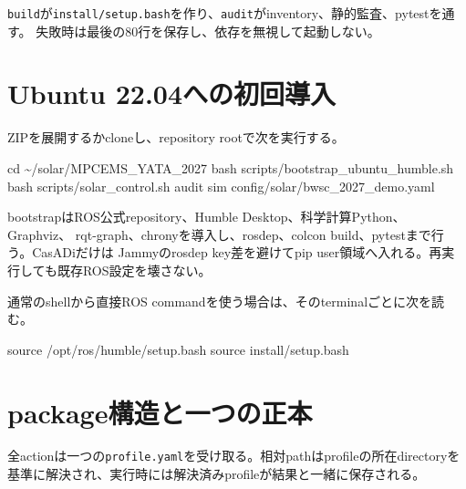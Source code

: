 \documentclass[
  japanese,
  a4paper,
]{article}
\newenvironment{Shaded}{}{}
\newcommand{\BuiltInTok}[1]{\textcolor[rgb]{0.00,0.50,0.00}{#1}}
\newcommand{\FunctionTok}[1]{\textcolor[rgb]{0.02,0.16,0.49}{#1}}
\newcommand{\NormalTok}[1]{#1}
\begin{document}
\texttt{build}が\texttt{install/setup.bash}を作り、\texttt{audit}がinventory、静的監査、pytestを通す。
失敗時は最後の80行を保存し、依存を無視して起動しない。

\section{Ubuntu
22.04への初回導入}\label{ubuntu-22.04ux3078ux306eux521dux56deux5c0eux5165}

ZIPを展開するかcloneし、repository rootで次を実行する。

\begin{Shaded}
\begin{Highlighting}[]
\BuiltInTok{cd}\NormalTok{ \textasciitilde{}/solar/MPCEMS\_YATA\_2027}
\FunctionTok{bash}\NormalTok{ scripts/bootstrap\_ubuntu\_humble.sh}
\FunctionTok{bash}\NormalTok{ scripts/solar\_control.sh audit sim config/solar/bwsc\_2027\_demo.yaml}
\end{Highlighting}
\end{Shaded}

bootstrapはROS公式repository、Humble Desktop、科学計算Python、Graphviz、
rqt-graph、chronyを導入し、rosdep、colcon
build、pytestまで行う。CasADiだけは Jammyのrosdep key差を避けてpip
user領域へ入れる。再実行しても既存ROS設定を壊さない。

通常のshellから直接ROS commandを使う場合は、そのterminalごとに次を読む。

\begin{Shaded}
\begin{Highlighting}[]
\BuiltInTok{source}\NormalTok{ /opt/ros/humble/setup.bash}
\BuiltInTok{source}\NormalTok{ install/setup.bash}
\end{Highlighting}
\end{Shaded}

\section{package構造と一つの正本}\label{packageux69cbux9020ux3068ux4e00ux3064ux306eux6b63ux672c}

全actionは一つの\texttt{profile.yaml}を受け取る。相対pathはprofileの所在directoryを
基準に解決され、実行時には解決済みprofileが結果と一緒に保存される。
\end{document}
